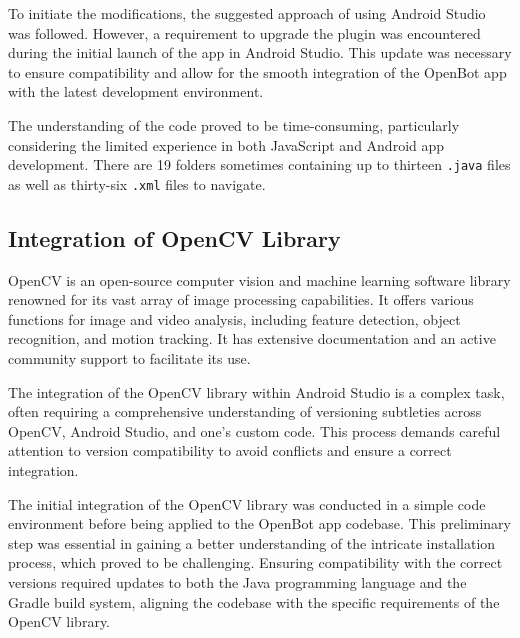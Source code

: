 \documentclass[12pt]{report}
\begin{document}
To initiate the modifications, the suggested approach of using Android Studio was followed. However, a requirement to upgrade the plugin was encountered during the initial launch of the app in Android Studio. This update was necessary to ensure compatibility and allow for the smooth integration of the OpenBot app with the latest development environment. 


The understanding of the code proved to be time-consuming, particularly considering the limited experience in both JavaScript and Android app development. There are 19 folders sometimes containing up to thirteen \texttt{.java} files as well as thirty-six \texttt{.xml} files to navigate. 


\subsection{Integration of OpenCV Library}
\label{sub:Integration_of_OpenCV_Library}

OpenCV is an open-source computer vision and machine learning software library renowned for its vast array of image processing capabilities. It offers various functions for image and video analysis, including feature detection, object recognition, and motion tracking. It has extensive documentation and an active community support to facilitate its use.


The integration of the OpenCV library within Android Studio is a complex task, often requiring a comprehensive understanding of versioning subtleties across OpenCV, Android Studio, and one's custom code. This process demands careful attention to version compatibility to avoid conflicts and ensure a correct integration.


The initial integration of the OpenCV library was conducted in a simple code environment before being applied to the OpenBot app codebase. This preliminary step was essential in gaining a better understanding of the intricate installation process, which proved to be challenging. Ensuring compatibility with the correct versions required updates to both the Java programming language and the Gradle build system, aligning the codebase with the specific requirements of the OpenCV library.
\end{document}
